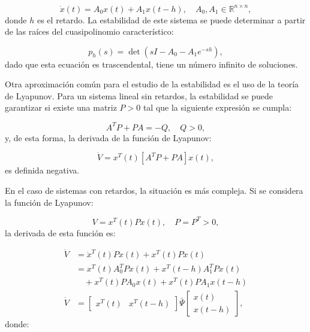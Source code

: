 \documentclass[conference]{IEEEtran}
\begin{document}
\begin{equation}
	\dot{x}(t) = A_0 x(t) + A_1 x(t-h), \quad A_0, A_1 \in \mathbb{R}^{n \times n},
\end{equation}
donde \( h \) es el retardo. La estabilidad de este sistema se puede determinar a partir de las raíces del cuasipolinomio característico:

\begin{equation}
	p_h(s) = \det(sI - A_0 - A_1 e^{-sh}),
\end{equation}
dado que esta ecuación es trascendental, tiene un número infinito de soluciones.

Otra aproximación común para el estudio de la estabilidad es el uso de la teoría de Lyapunov. Para un sistema lineal sin retardos, la estabilidad se puede garantizar si existe una matriz \( P > 0 \) tal que la siguiente expresión se cumpla:

\begin{equation}
	A^T P + P A = -Q, \quad Q > 0,
\end{equation}
y, de esta forma, la derivada de la función de Lyapunov:

\begin{equation}
	\dot{V} = x^T(t) [A^T P + P A] x(t),
\end{equation}
es definida negativa.

En el caso de sistemas con retardos, la situación es más compleja. Si se considera la función de Lyapunov:

\begin{equation}
	V = x^T(t) P x(t), \quad P = P^T > 0,
\end{equation}
la derivada de esta función es:

\begin{equation}
	\begin{aligned}
		\dot{V} & = \dot{x}^T(t) P x(t) + x^T(t) P \dot{x}(t)                                                                \\
		        & = x^T(t) A_0^T P x(t) + x^T(t-h) A_1^T P x(t)                                                              \\
		        & \quad + x^T(t) P A_0 x(t) + x^T(t) P A_1 x(t-h)                                                            \\
		\dot{V} & = \begin{bmatrix} x^T(t) & x^T(t-h) \end{bmatrix} \bar{\Psi} \begin{bmatrix} x(t) \\ x(t-h) \end{bmatrix},
	\end{aligned}
\end{equation}
donde:
\end{document}
